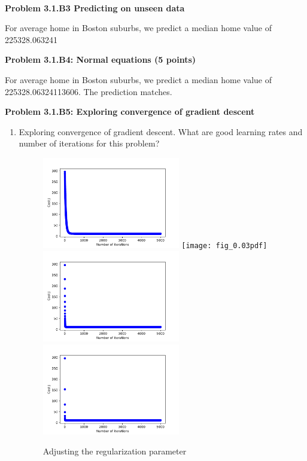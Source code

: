 \documentclass[]{book}
\theoremstyle{definition}
\begin{document}
\\
\textbf{Problem 3.1.B3 Predicting on unseen data}
\begin{flushleft}
	For average home in Boston suburbs, we predict a median home value of 225328.063241
\end{flushleft}
\textbf{Problem 3.1.B4: Normal equations (5 points)}
\begin{flushleft}
	For average home in Boston suburbs, we predict a median home value of 225328.06324113606. The prediction matches.
\end{flushleft}
\textbf{Problem 3.1.B5: Exploring convergence of gradient descent}
\begin{enumerate}
	\item Exploring convergence of gradient descent. What are good learning rates and number of iterations for this problem?
\begin{figure}[H]
	\includegraphics[width=6cm]{fig_0.01.pdf}
	\texttt{[image: fig\_0.03pdf]}
	\includegraphics[width=6cm]{fig_0.1.pdf}
	\includegraphics[width=6cm]{fig_0.3.pdf}
	\caption{Adjusting the regularization parameter}
	\label{fig:5}
\end{figure}		
\end{enumerate}
\end{document}
